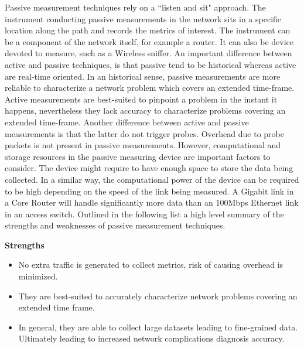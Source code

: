 Passive measurement techniques rely on a ``listen and sit" approach. The instrument conducting passive measurements in the network sits in a specific location along the path and records the metrics of interest. The instrument can be a component of the network itself, for example a router. It can also be device devoted to measure, such as a Wireless sniffer. An important difference between active and passive techniques, is that passive tend to be historical whereas active are real-time oriented. In an historical sense, passive measurements are more reliable to characterize a network problem which covers an extended time-frame. Active measurements are best-suited to pinpoint a problem in the instant it happens, nevertheless they lack accuracy to characterize problems covering an extended time-frame. Another difference between active and passive measurements is that the latter do not trigger probes. Overhead due to probe packets is not present in passive measurements. However, computational and storage resources in the passive measuring device are important factors to consider. The device might require to have enough space to store the data being collected. In a similar way, the computational power of the device can be required to be high depending on the speed of the link being measured. A Gigabit link in a Core Router will handle significantly more data than an 100Mbps Ethernet link in an access switch. 
Outlined in the following list a high level summary of the strengths and weaknesses of passive measurement techniques.

\textbf{Strengths}
\begin{itemize}
	\item No extra traffic is generated to collect metrics, risk of causing overhead is minimized.
	\item They are best-suited to accurately characterize network problems covering an extended time frame.
	\item In general, they are able to collect large datasets leading to fine-grained data. Ultimately leading to increased network complications diagnosis accuracy.

\end{itemize}


